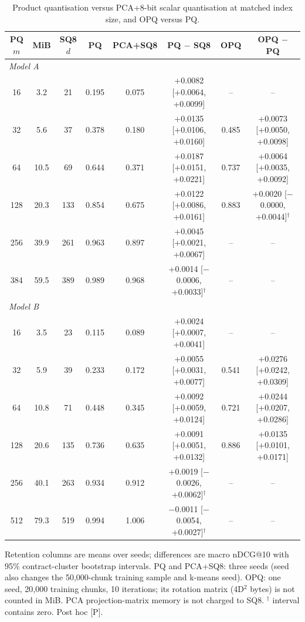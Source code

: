 \begin{table}[t]
\centering\small
\caption{Product quantisation versus PCA+8-bit scalar quantisation at matched index size, and OPQ versus PQ.}
\label{tab:pq}
\begin{tabular}{cccccccc}
\toprule
PQ $m$ & MiB & SQ8 $d$ & PQ & PCA+SQ8 & PQ $-$ SQ8 & OPQ & OPQ $-$ PQ \\
\midrule
\multicolumn{8}{l}{\textit{Model A}} \\
16 & 3.2 & 21 & 0.195 & 0.075 & +0.0082 [+0.0064, +0.0099] & -- & -- \\
32 & 5.6 & 37 & 0.378 & 0.180 & +0.0135 [+0.0106, +0.0160] & 0.485 & +0.0073 [+0.0050, +0.0098] \\
64 & 10.5 & 69 & 0.644 & 0.371 & +0.0187 [+0.0151, +0.0221] & 0.737 & +0.0064 [+0.0035, +0.0092] \\
128 & 20.3 & 133 & 0.854 & 0.675 & +0.0122 [+0.0086, +0.0161] & 0.883 & +0.0020 [$-$0.0000, +0.0044]$^\dagger$ \\
256 & 39.9 & 261 & 0.963 & 0.897 & +0.0045 [+0.0021, +0.0067] & -- & -- \\
384 & 59.5 & 389 & 0.989 & 0.968 & +0.0014 [$-$0.0006, +0.0033]$^\dagger$ & -- & -- \\
\midrule
\multicolumn{8}{l}{\textit{Model B}} \\
16 & 3.5 & 23 & 0.115 & 0.089 & +0.0024 [+0.0007, +0.0041] & -- & -- \\
32 & 5.9 & 39 & 0.233 & 0.172 & +0.0055 [+0.0031, +0.0077] & 0.541 & +0.0276 [+0.0242, +0.0309] \\
64 & 10.8 & 71 & 0.448 & 0.345 & +0.0092 [+0.0059, +0.0124] & 0.721 & +0.0244 [+0.0207, +0.0286] \\
128 & 20.6 & 135 & 0.736 & 0.635 & +0.0091 [+0.0051, +0.0132] & 0.886 & +0.0135 [+0.0101, +0.0171] \\
256 & 40.1 & 263 & 0.934 & 0.912 & +0.0019 [$-$0.0026, +0.0062]$^\dagger$ & -- & -- \\
512 & 79.3 & 519 & 0.994 & 1.006 & $-$0.0011 [$-$0.0054, +0.0027]$^\dagger$ & -- & -- \\
\bottomrule
\end{tabular}
\par\smallskip\footnotesize Retention columns are means over seeds; differences are macro nDCG@10 with 95\% contract-cluster bootstrap intervals. PQ and PCA+SQ8: three seeds (seed also changes the 50,000-chunk training sample and k-means seed). OPQ: one seed, 20,000 training chunks, 10 iterations; its rotation matrix (4D$^2$ bytes) is not counted in MiB. PCA projection-matrix memory is not charged to SQ8. $^\dagger$ interval contains zero. Post hoc [P].
\end{table}